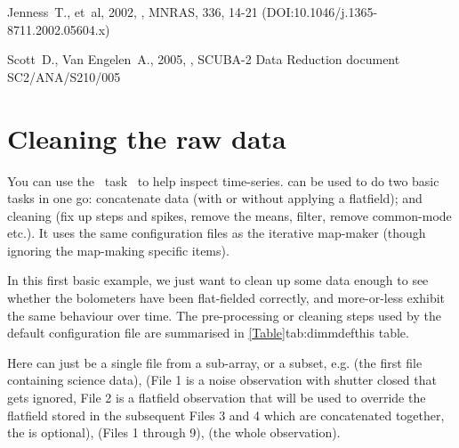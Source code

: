 \documentclass[11pt,oneside,chapters]{starlink}
\begin{document}
\begin{thebibliography}{}
Jenness~T., et~al, 2002, ,
MNRAS, 336, 14-21 (DOI:10.1046/j.1365-8711.2002.05604.x)

Scott~D., Van Engelen~A., 2005, ,
SCUBA-2 Data Reduction document SC2/ANA/S210/005

\end{thebibliography}

\newpage
\appendix

\chapter{Cleaning the raw data}
\label{app:clean}

You can use the \smurf\ task \clean\ to help inspect time-series.
 can be used to do two basic tasks in one go: concatenate data
(with or without applying a flatfield); and cleaning (fix up steps and
spikes, remove the means, filter, remove common-mode etc.). It uses
the same configuration files as the iterative map-maker (though
ignoring the map-making specific items).

In this first basic example, we just want to clean up some data enough
to see whether the bolometers have been flat-fielded correctly, and
more-or-less exhibit the same behaviour over time. The pre-processing
or cleaning steps used by the default configuration file are
summarised in \cref{Table}{tab:dimmdef}{this table}.

\begin{terminalv}
\end{terminalv}

Here  can just be a single file from a sub-array, or a
subset, e.g.  (the first file
containing science data), 
(File 1 is a noise observation with shutter closed that gets ignored,
File 2 is a flatfield observation that will be used to override the
flatfield stored in the subsequent Files 3 and 4 which are
concatenated together, the  is optional),
 (Files 1 through 9),
 (the whole observation).
\end{document}
